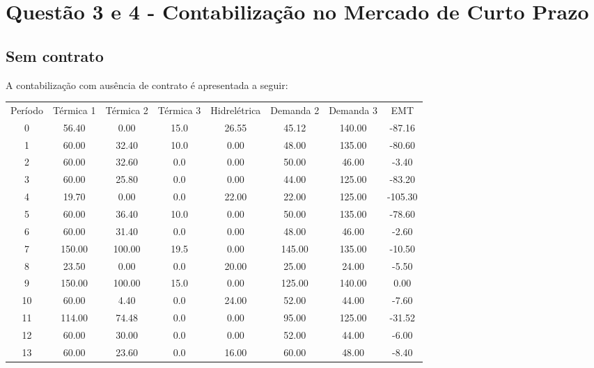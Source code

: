 \documentclass[a4paper,12pt,twoside]{article}
\begin{document}
\newpage

\section{Questão 3 e 4 - Contabilização no Mercado de Curto Prazo}
\subsection{Sem contrato}
A contabilização com ausência de contrato é apresentada a seguir:

\begin{center}
    \begin{tabular}{ c c c c c c c c }
        Período & Térmica 1  & Térmica 2  & Térmica 3  & Hidrelétrica  & Demanda 2  & Demanda 3      & EMT \\
        0    & 56.40     & 0.00     & 15.0  & 26.55   & 45.12  & 140.00  & -87.16 \\
        1    & 60.00    & 32.40     & 10.0   & 0.00   & 48.00  & 135.00  & -80.60 \\
        2    & 60.00    & 32.60      & 0.0   & 0.00   & 50.00   & 46.00   & -3.40 \\
        3    & 60.00    & 25.80      & 0.0   & 0.00   & 44.00  & 125.00  & -83.20 \\
        4    & 19.70     & 0.00      & 0.0  & 22.00   & 22.00  & 125.00 & -105.30 \\
        5    & 60.00    & 36.40     & 10.0   & 0.00   & 50.00  & 135.00  & -78.60 \\
        6    & 60.00    & 31.40      & 0.0   & 0.00   & 48.00   & 46.00   & -2.60 \\
        7   & 150.00   & 100.00     & 19.5   & 0.00  & 145.00  & 135.00  & -10.50 \\
        8    & 23.50     & 0.00      & 0.0  & 20.00   & 25.00   & 24.00   & -5.50 \\
        9   & 150.00   & 100.00     & 15.0   & 0.00  & 125.00  & 140.00    & 0.00 \\
        10   & 60.00     & 4.40      & 0.0  & 24.00   & 52.00   & 44.00   & -7.60 \\
        11  & 114.00    & 74.48      & 0.0   & 0.00   & 95.00  & 125.00  & -31.52 \\
        12   & 60.00    & 30.00      & 0.0   & 0.00   & 52.00   & 44.00   & -6.00 \\
        13   & 60.00    & 23.60      & 0.0  & 16.00   & 60.00   & 48.00   & -8.40 \\

\end{tabular}
\end{center}
\end{document}
